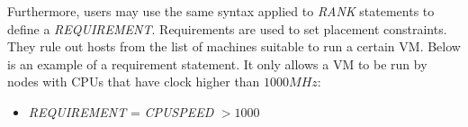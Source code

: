 Furthermore, users may use the same syntax applied to \textit{RANK} statements to define a \textit{REQUIREMENT}. Requirements are used to set placement constraints. They rule out hosts from the list of machines suitable to run a certain VM. Below is an example of a requirement statement. It only allows  a VM to be run by nodes with CPUs that have clock higher than $1000 MHz$:
\begin{itemize}
 \item \textit{REQUIREMENT} = \textit{CPUSPEED} $> 1000$ 
\end{itemize}


